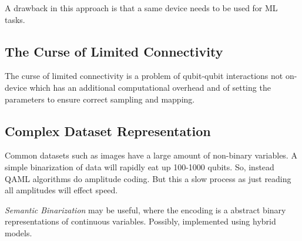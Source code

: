 A drawback in this approach is that a same device needs to be used for ML tasks.
\subsection{The Curse of Limited Connectivity}
The curse of limited connectivity is a problem of qubit-qubit interactions not on-device which has an additional computational overhead and of setting the parameters to ensure correct sampling and mapping.
\subsection{Complex Dataset Representation}
Common datasets such as images have a large amount of non-binary variables. A simple binarization of data  will rapidly eat up 100-1000 qubits. So, instead QAML algorithms do amplitude coding. But this a slow process as just reading all amplitudes will effect speed.

\emph{Semantic Binarization} may be useful, where the encoding is a abstract binary representations of continuous variables. Possibly, implemented using hybrid models.